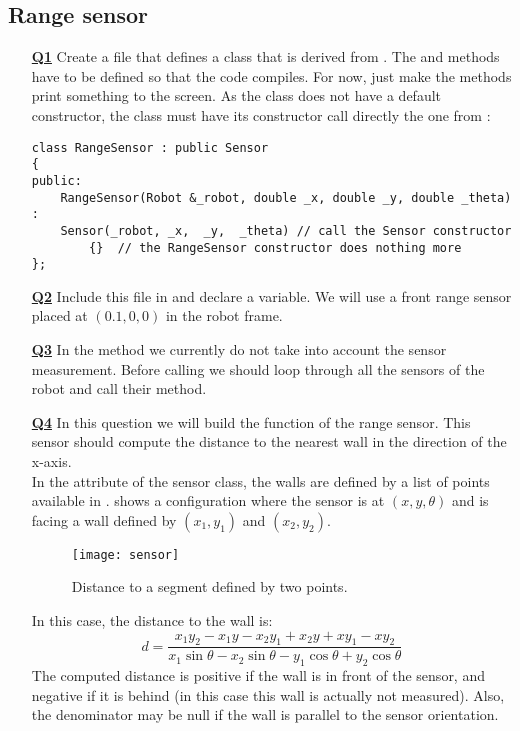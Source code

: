 \documentclass{ecnreport}
\begin{document}
\subsection{Range sensor}


\begin{itemize}
\medskip\item[\textbf{\underline{Q1}}] Create a  file that defines a  class that is derived from . The  and  methods have to be defined so that the code compiles. For now, just make the methods print something to the screen.
As the  class does not have a default constructor, the  class must have its constructor call directly the one from  :
\begin{center}\cppstyle
\begin{lstlisting}
class RangeSensor : public Sensor
{
public:
    RangeSensor(Robot &_robot, double _x, double _y, double _theta) :
	Sensor(_robot, _x,  _y,  _theta) // call the Sensor constructor
        {}	// the RangeSensor constructor does nothing more
};    
\end{lstlisting}
\end{center}

\medskip\item[\textbf{\underline{Q2}}] Include this file in  and declare a  variable.  We will use a front range sensor placed at $(0.1, 0,0)$ in the robot frame.

\medskip\item[\textbf{\underline{Q3}}] In the  method we currently do not take into account the sensor measurement.
Before calling  we should loop through all the sensors of the robot and call their  method.

\medskip\item[\textbf{\underline{Q4}}] In this question we will build the  function of the range sensor.
This sensor should compute the distance to the nearest wall in the direction of the x-axis.\\

In the  attribute of the sensor class, the walls are defined by a list of points available in .  shows a configuration where the sensor is at $(x,y,\theta)$ and is facing a wall defined by $(x_1,y_1)$ and $(x_2,y_2)$.
\begin{figure}[h]\centering
\texttt{[image: sensor]}
\caption{Distance to a segment defined by two points.}
\label{fig:dist}
\end{figure}
In this case, the distance to the wall is:
\begin{equation}
d = \frac{x_{1} y_{2} - x_{1} y - x_{2} y_{1} + x_{2} y + x y_{1} - x y_{2}}{x_{1} \sin\theta - x_{2} \sin\theta - y_{1} \cos\theta + y_{2} \cos\theta}
\end{equation}
The computed distance is positive if the wall is in front of the sensor, and negative if it is behind (in this case this wall is actually not measured). Also, the denominator may be null if the wall is parallel to the sensor orientation.


\end{itemize}
\end{document}
